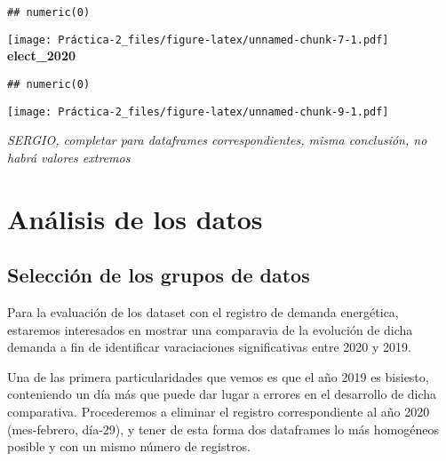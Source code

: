 \documentclass[
]{article}
\newenvironment{Shaded}{\begin{snugshade}}{\end{snugshade}}
\newcommand{\DecValTok}[1]{\textcolor[rgb]{0.86,0.86,0.80}{#1}}
\newcommand{\KeywordTok}[1]{\textcolor[rgb]{0.94,0.87,0.69}{#1}}
\newcommand{\NormalTok}[1]{\textcolor[rgb]{0.80,0.80,0.80}{#1}}
\newcommand{\OperatorTok}[1]{\textcolor[rgb]{0.94,0.94,0.82}{#1}}
\begin{document}
\begin{Shaded}
\end{Shaded}

\begin{verbatim}
## numeric(0)
\end{verbatim}

\texttt{[image: Práctica-2\_files/figure-latex/unnamed-chunk-7-1.pdf]}
\textbf{elect\_2020}

\begin{Shaded}
\end{Shaded}

\begin{verbatim}
## numeric(0)
\end{verbatim}

\texttt{[image: Práctica-2\_files/figure-latex/unnamed-chunk-9-1.pdf]}

{ \emph{SERGIO, completar para dataframes correspondientes, misma
conclusión, no habrá valores extremos}}

\hypertarget{anuxe1lisis-de-los-datos}{%
\section{Análisis de los datos}\label{anuxe1lisis-de-los-datos}}

\hypertarget{selecciuxf3n-de-los-grupos-de-datos}{%
\subsection{Selección de los grupos de
datos}\label{selecciuxf3n-de-los-grupos-de-datos}}

Para la evaluación de los dataset con el registro de demanda energética,
estaremos interesados en mostrar una comparavia de la evolución de dicha
demanda a fin de identificar varaciaciones significativas entre 2020 y
2019.

Una de las primera particularidades que vemos es que el año 2019 es
bisiesto, conteniendo un día más que puede dar lugar a errores en el
desarrollo de dicha comparativa. Procederemos a eliminar el registro
correspondiente al año 2020 (mes-febrero, día-29), y tener de esta forma
dos dataframes lo más homogéneos posible y con un mismo número de
registros.
\end{document}
